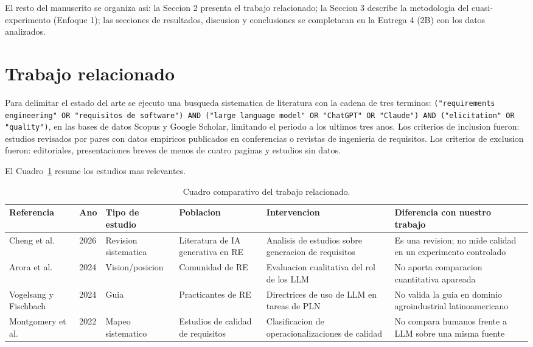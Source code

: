 \documentclass[11pt,a4paper]{article}
\begin{document}
El resto del manuscrito se organiza asi: la Seccion 2 presenta el trabajo
relacionado; la Seccion 3 describe la metodologia del cuasi-experimento
(Enfoque 1); las secciones de resultados, discusion y conclusiones se
completaran en la Entrega 4 (2B) con los datos analizados.

\section{Trabajo relacionado}

Para delimitar el estado del arte se ejecuto una busqueda sistematica de
literatura con la cadena de tres terminos: \texttt{("requirements engineering"
OR "requisitos de software") AND ("large language model" OR "ChatGPT" OR
"Claude") AND ("elicitation" OR "quality")}, en las bases de datos Scopus y
Google Scholar, limitando el periodo a los ultimos tres anos. Los criterios de
inclusion fueron: estudios revisados por pares con datos empiricos publicados
en conferencias o revistas de ingenieria de requisitos. Los criterios de
exclusion fueron: editoriales, presentaciones breves de menos de cuatro paginas
y estudios sin datos.

El Cuadro~\ref{tab:relacionado} resume los estudios mas relevantes.

\begin{table}[htbp]
\centering
\small
\begin{tabular}{p{2.6cm} p{0.9cm} p{1.7cm} p{2.2cm} p{3.2cm} p{3.0cm}}
\toprule
\textbf{Referencia} & \textbf{Ano} & \textbf{Tipo de estudio} & \textbf{Poblacion} & \textbf{Intervencion} & \textbf{Diferencia con nuestro trabajo} \\
\midrule
Cheng et al.\ \cite{cheng2026} & 2026 & Revision sistematica & Literatura de IA generativa en RE & Analisis de estudios sobre generacion de requisitos & Es una revision; no mide calidad en un experimento controlado \\
Arora et al.\ \cite{arora2024} & 2024 & Vision/posicion & Comunidad de RE & Evaluacion cualitativa del rol de los LLM & No aporta comparacion cuantitativa apareada \\
Vogelsang y Fischbach \cite{vogelsang2024} & 2024 & Guia & Practicantes de RE & Directrices de uso de LLM en tareas de PLN & No valida la guia en dominio agroindustrial latinoamericano \\
Montgomery et al.\ \cite{montgomery2022} & 2022 & Mapeo sistematico & Estudios de calidad de requisitos & Clasificacion de operacionalizaciones de calidad & No compara humanos frente a LLM sobre una misma fuente \\
\bottomrule
\end{tabular}
\caption{Cuadro comparativo del trabajo relacionado.}
\label{tab:relacionado}
\end{table}
\end{document}

